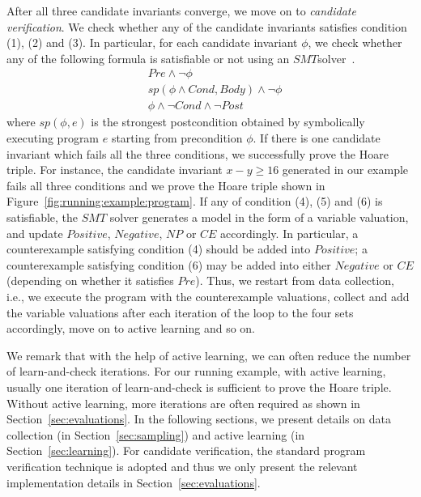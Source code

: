After all three candidate invariants converge, we move on to \emph{candidate verification}. 
We check whether any of the candidate invariants satisfies condition (1), (2) and (3). 
In particular, for each candidate invariant $\phi$, we check whether any of the following formula is satisfiable or not using an $\mathit{SMT}$solver~\cite{barrett2009satisfiability,de2008z3}.
\begin{align}
    & \mathit{Pre} \land \neg \phi \label{check:inv:pre} \\
     & sp(\phi \land \mathit{Cond}, \mathit{Body}) \land \neg \phi \label{check:inv:loop} \\
    & \phi \land \neg \mathit{Cond} \land \neg \mathit{Post} \label{check:inv:post}
\end{align}
where $\mathit{sp}(\phi,e)$ is the strongest postcondition obtained by
symbolically executing program $e$
starting from precondition $\phi$.
If there is one candidate invariant which fails all the three conditions, we successfully prove the Hoare triple. 
For instance, the candidate invariant $\mathit{x - y \geq 16}$ generated in our example fails all three conditions and we prove the Hoare triple shown in Figure~\ref{fig:running:example:program}. 
If any of condition (4), (5) and (6) is satisfiable, the $\mathit{SMT}$ solver generates a model in the form of a variable valuation, 
and update $\mathit{Positive}$, $\mathit{Negative}$, $\mathit{NP}$ or $\mathit{CE}$ accordingly. %
In particular, a counterexample satisfying condition (4) should be added into $\mathit{Positive}$; 
a counterexample satisfying condition (6) may be added into either $\mathit{Negative}$ or $\mathit{CE}$ (depending on whether it satisfies $\mathit{Pre}$). 
Thus, we restart from data collection, i.e., we execute the program with the counterexample valuations, 
collect and add the variable valuations after each iteration of the loop to the four sets accordingly, move on to active learning and so on.

We remark that with the help of active learning, we can often reduce the number of learn-and-check iterations.%
For our running example, with active learning, usually one iteration of learn-and-check is sufficient to prove the Hoare triple. 
Without active learning, more iterations are often required as shown in Section~\ref{sec:evaluations}. 
In the following sections, we present details on data collection (in Section~\ref{sec:sampling}) and active learning (in Section~\ref{sec:learning}). 
For candidate verification, the standard program verification technique is adopted and thus we only present the relevant implementation details in Section~\ref{sec:evaluations}.

